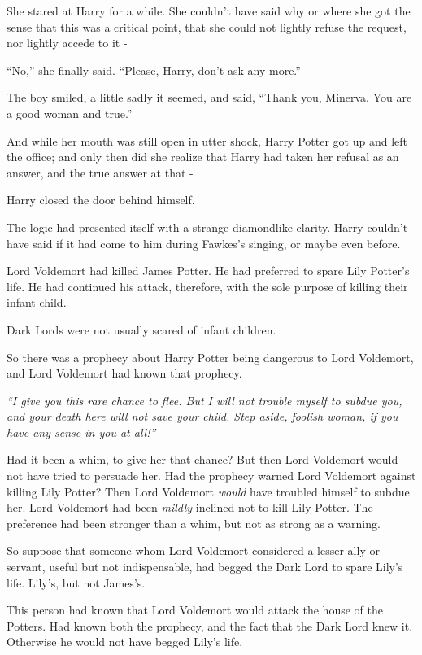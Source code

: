 She stared at Harry for a while. She couldn't have said why or where she
got the sense that this was a critical point, that she could not lightly
refuse the request, nor lightly accede to it -

``No,'' she finally said. ``Please, Harry, don't ask any more.''

The boy smiled, a little sadly it seemed, and said, ``Thank you,
Minerva. You are a good woman and true.''

And while her mouth was still open in utter shock, Harry Potter got up
and left the office; and only then did she realize that Harry had taken
her refusal as an answer, and the true answer at that -

Harry closed the door behind himself.

The logic had presented itself with a strange diamondlike clarity. Harry
couldn't have said if it had come to him during Fawkes's singing, or
maybe even before.

Lord Voldemort had killed James Potter. He had preferred to spare Lily
Potter's life. He had continued his attack, therefore, with the sole
purpose of killing their infant child.

Dark Lords were not usually scared of infant children.

So there was a prophecy about Harry Potter being dangerous to Lord
Voldemort, and Lord Voldemort had known that prophecy.

\emph{``I give you this rare chance to flee. But I will not trouble
myself to subdue you, and your death here will not save your child. Step
aside, foolish woman, if you have any sense in you at all!''}

Had it been a whim, to give her that chance? But then Lord Voldemort
would not have tried to persuade her. Had the prophecy warned Lord
Voldemort against killing Lily Potter? Then Lord Voldemort \emph{would}
have troubled himself to subdue her. Lord Voldemort had been
\emph{mildly} inclined not to kill Lily Potter. The preference had been
stronger than a whim, but not as strong as a warning.

So suppose that someone whom Lord Voldemort considered a lesser ally or
servant, useful but not indispensable, had begged the Dark Lord to spare
Lily's life. Lily's, but not James's.

This person had known that Lord Voldemort would attack the house of the
Potters. Had known both the prophecy, and the fact that the Dark Lord
knew it. Otherwise he would not have begged Lily's life.

